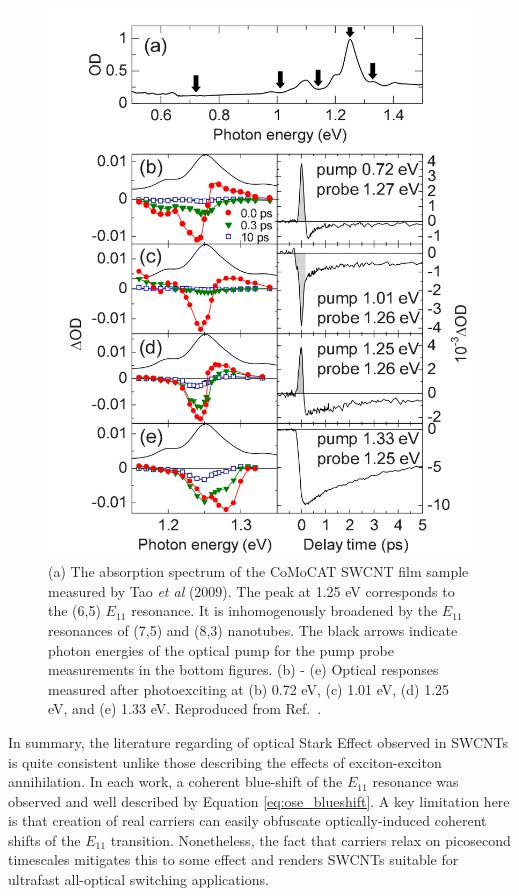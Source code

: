 \begin{figure}[ht]
	\centering
	\includegraphics[scale=0.25]{images/chapter_prior_works/abs_dtt_tao_2009}
	\caption{(a) The absorption spectrum of the CoMoCAT SWCNT film sample measured by Tao \textit{et al} (2009). The peak at 1.25 eV corresponds to the (6,5) $E_{11}$ resonance. It is inhomogenously broadened by the $E_{11}$ resonances of (7,5) and (8,3) nanotubes. The black arrows indicate photon energies of the optical pump for the pump probe measurements in the bottom figures. (b) - (e) Optical responses measured after photoexciting at (b) 0.72 eV, (c) 1.01 eV, (d) 1.25 eV, and (e) 1.33 eV.  Reproduced from Ref.\ \cite{tao2009subpicosecond}.}
	\label{fig:abs_dtt_tao_2009}
\end{figure}

In summary, the literature regarding of optical Stark Effect observed in SWCNTs is quite consistent unlike those describing the effects of exciton-exciton annihilation. In each work, a coherent blue-shift of the $E_{11}$ resonance was observed and well described by Equation \eqref{eq:ose_blueshift}. A key limitation here is that creation of real carriers can easily obfuscate optically-induced coherent shifts of the $E_{11}$ transition. Nonetheless, the fact that carriers relax on picosecond timescales mitigates this to some effect and renders SWCNTs suitable for ultrafast all-optical switching applications.


